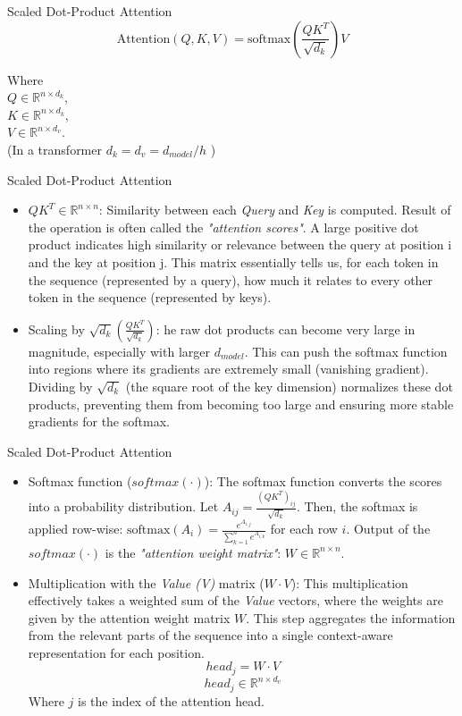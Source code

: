 \documentclass{beamer}
\begin{document}
\begin{frame}{Scaled Dot-Product Attention}
    $$ \text{Attention}(Q, K, V) = \text{softmax}\left(\frac{QK^T}{\sqrt{d_k}}\right)V $$

    Where \\ $Q \in \mathbb{R}^{n \times d_k}$, \\
    $K \in \mathbb{R}^{n \times d_k}$, \\
    $V \in \mathbb{R}^{n \times d_v}$. \\
    (In a transformer $d_k = d_v = d_{model}/h$ \cite{vaswani2017attention})

\end{frame}


\begin{frame}{Scaled Dot-Product Attention}
    \begin{itemize}
        \item $QK^T \in \mathbb{R}^{n \times n}$: Similarity between each \textit{Query} and \textit{Key} is computed. Result of the operation is often
        called the \textit{"attention scores"}. A large positive dot product indicates high similarity or 
        relevance between the query at position i and the key at position j. 
        This matrix essentially tells us, for each token in the sequence (represented by a query), how much it relates to every other token in the sequence (represented by keys).
        \item Scaling by $\sqrt{d_k} \left( \frac{QK^T}{\sqrt{d_k}} \right)$: he raw dot products can 
        become very large in magnitude, especially with larger $d_{model}$. 
        This can push the softmax function into regions where its gradients are extremely small (vanishing gradient).
        Dividing by $\sqrt{d_k}$ (the square root of the key dimension) normalizes these dot products, preventing them from becoming too large 
        and ensuring more stable gradients for the softmax.
    \end{itemize}
\end{frame}

\begin{frame}{Scaled Dot-Product Attention}
  \begin{itemize}
    \item Softmax function ($softmax(\cdot)$): The softmax function converts the scores into a probability distribution.
    Let $A_{ij} = \frac{(QK^T)_{ij}}{\sqrt{d_k}}$. Then, the softmax is applied row-wise: $\text{softmax}(A_i) = \frac{e^{A_{i,j}}}{\sum_{k=1}^n e^{A_{i,k}}}$ for each row $i$.
    Output of the $softmax(\cdot)$ is the \textit{"attention weight matrix"}: $W \in \mathbb{R}^{n \times n}$. 
    \item Multiplication with the \textit{Value (V)} matrix ($W \cdot V$): This multiplication effectively takes a weighted sum of the \textit{Value} vectors, 
    where the weights are given by the attention weight matrix $W$. This step aggregates the information from the relevant parts of the sequence into a single context-aware representation for each position.
    $$head_j = W \cdot V$$
    $$head_j \in \mathbb{R}^{n \times d_v}$$
    Where $j$ is the index of the attention head.
  \end{itemize}
\end{frame}
\end{document}
